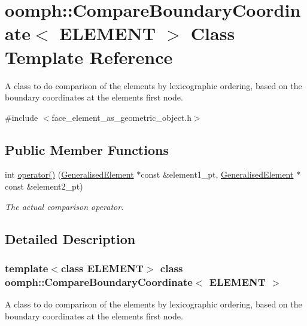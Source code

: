 \hypertarget{classoomph_1_1CompareBoundaryCoordinate}{}\section{oomph\+:\+:Compare\+Boundary\+Coordinate$<$ E\+L\+E\+M\+E\+NT $>$ Class Template Reference}
\label{classoomph_1_1CompareBoundaryCoordinate}


A class to do comparison of the elements by lexicographic ordering, based on the boundary coordinates at the element\textquotesingle{}s first node.  




{\ttfamily \#include $<$face\+\_\+element\+\_\+as\+\_\+geometric\+\_\+object.\+h$>$}

\subsection*{Public Member Functions}
\begin{DoxyCompactItemize}
\item 
int \hyperlink{classoomph_1_1CompareBoundaryCoordinate_a352523d5f49b9d36ce94701a82926f11}{operator()} (\hyperlink{classoomph_1_1GeneralisedElement}{Generalised\+Element} $\ast$const \&element1\+\_\+pt, \hyperlink{classoomph_1_1GeneralisedElement}{Generalised\+Element} $\ast$const \&element2\+\_\+pt)
\begin{DoxyCompactList}\small\item\em The actual comparison operator. \end{DoxyCompactList}\end{DoxyCompactItemize}


\subsection{Detailed Description}
\subsubsection*{template$<$class E\+L\+E\+M\+E\+NT$>$\newline
class oomph\+::\+Compare\+Boundary\+Coordinate$<$ E\+L\+E\+M\+E\+N\+T $>$}

A class to do comparison of the elements by lexicographic ordering, based on the boundary coordinates at the element\textquotesingle{}s first node. 

